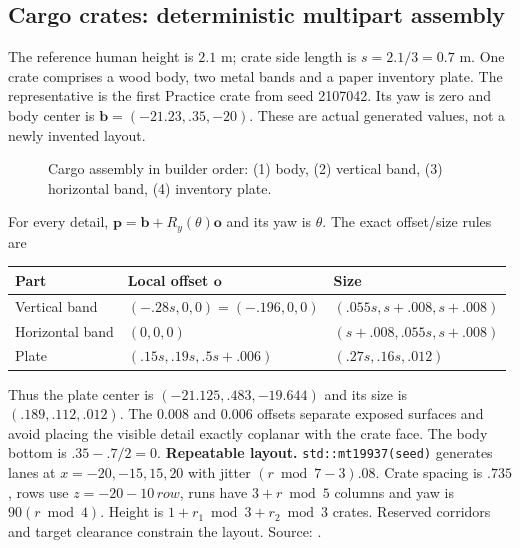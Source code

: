 \subsection{Cargo crates: deterministic multipart assembly}
The reference human height is $2.1$ m; crate side length is $s=2.1/3=0.7$ m. One crate comprises a wood body, two metal bands and a paper inventory plate. The representative is the first Practice crate from seed 2107042. Its yaw is zero and body center is $\mathbf b=(-21.23,.35,-20)$. These are actual generated values, not a newly invented layout.
\begin{figure}[htbp]

\caption{Cargo assembly in builder order: (1) body, (2) vertical band, (3) horizontal band, (4) inventory plate.}
\end{figure}

For every detail, $\mathbf p=\mathbf b+R_y(\theta)\mathbf o$ and its yaw is $\theta$. The exact offset/size rules are
\begin{center}\begin{tabular}{lll}\toprule
Part & Local offset $\mathbf o$ & Size \\\midrule
Vertical band & $(-.28s,0,0)=(-.196,0,0)$ & $(.055s,s+.008,s+.008)$\\
Horizontal band & $(0,0,0)$ & $(s+.008,.055s,s+.008)$\\
Plate & $(.15s,.19s,.5s+.006)$ & $(.27s,.16s,.012)$\\\bottomrule
\end{tabular}\end{center}
Thus the plate center is $(-21.125,.483,-19.644)$ and its size is $(.189,.112,.012)$. The $0.008$ and $0.006$ offsets separate exposed surfaces and avoid placing the visible detail exactly coplanar with the crate face. The body bottom is $.35-.7/2=0$.
\textbf{Repeatable layout.} \texttt{std::mt19937(seed)} generates lanes at $x=-20,-15,15,20$ with jitter $(r\bmod7-3).08$. Crate spacing is $.735$, rows use $z=-20-10\,row$, runs have $3+r\bmod5$ columns and yaw is $90(r\bmod4)$. Height is $1+r_1\bmod3+r_2\bmod3$ crates. Reserved corridors and target clearance constrain the layout. Source: .
